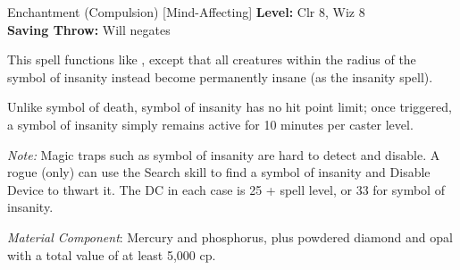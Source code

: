 {Enchantment (Compulsion) [Mind-Affecting]}
{
	\textbf{Level:}
	Clr 8, Wiz 8\\
	\textbf{Saving Throw:}
	Will negates\\
}
{
	This spell functions like , except that all creatures within the radius of the symbol of insanity instead become permanently insane (as the insanity spell).

	Unlike symbol of death, symbol of insanity has no hit point limit; once triggered, a symbol of insanity simply remains active for 10 minutes per caster level.

	\textit{Note:} Magic traps such as symbol of insanity are hard to detect and disable. A rogue (only) can use the Search skill to find a symbol of insanity and Disable Device to thwart it. The DC in each case is 25 + spell level, or 33 for symbol of insanity.

	\textit{Material Component}:
	Mercury and phosphorus, plus powdered diamond and opal with a total value of at least 5,000 cp.

}

